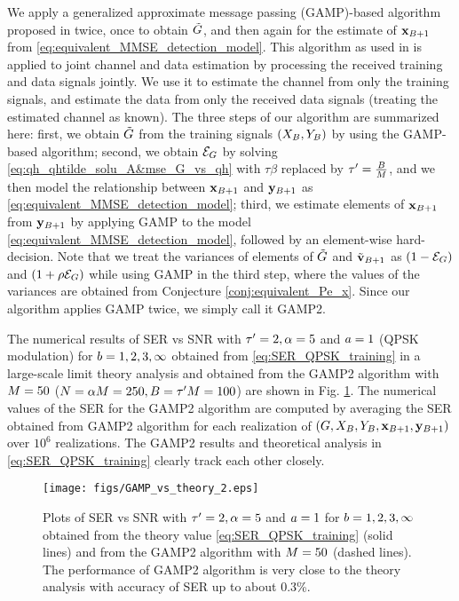 \documentclass[12pt, draftclsnofoot,journal,onecolumn]{IEEEtran}
\begin{document}
We apply a generalized approximate message passing (GAMP)-based algorithm proposed in \cite{wen2016bayes} twice, once to obtain $\tilde{G}$, and then again for the estimate of ${\mathbf{x}}_{B+1}$ from \eqref{eq:equivalent_MMSE_detection_model}. This algorithm as used in \cite{wen2016bayes} is applied to joint channel and data estimation by processing the received training and data signals jointly. We use it to estimate the channel from only the training signals, and estimate the data from only the received data signals (treating the estimated channel as known). The three steps of our algorithm are summarized here: first, we obtain $\tilde{G}$ from the training signals $(X_{B},Y_{B})$ by using the GAMP-based algorithm; second, we obtain ${\mathcal{E}}_{G}$ by solving \eqref{eq:qh_qhtilde_solu_A&mse_G_vs_qh} with $\tau\beta$ replaced by $\tau'=\frac{B}{M}$, and we then model the relationship between ${\mathbf{x}}_{B+1}$ and ${\mathbf{y}}_{B+1}$ as \eqref{eq:equivalent_MMSE_detection_model}; third, we estimate elements of ${\mathbf{x}}_{B+1}$ from ${\mathbf{y}}_{B+1}$ by applying GAMP to the model \eqref{eq:equivalent_MMSE_detection_model}, followed by an element-wise hard-decision. Note that we treat the variances of elements of $\tilde{G}$ and $\tilde{{\mathbf{v}}}_{B+1}$ as $(1-{\mathcal{E}}_{G})$ and $(1+\rho{\mathcal{E}}_{G})$ while using GAMP in the third step, where the values of the variances are obtained from Conjecture \ref{conj:equivalent_Pe_x}.  
Since our algorithm applies GAMP twice, we simply call it GAMP2.


The numerical results of SER vs SNR with 
 $\tau'=2,\alpha=5$ and $a=1$ (QPSK modulation) for $b=1,2,3,\infty$ obtained from \eqref{eq:SER_QPSK_training} in a large-scale limit theory analysis and obtained from the GAMP2 algorithm with $M=50$ ($N=\alpha M=250, B=\tau'M=100$) are shown in Fig. \ref{fig:GAMP_vs_theory}. The numerical values of the SER for the GAMP2 algorithm are computed by averaging the SER obtained from GAMP2 algorithm for each realization of $(G, X_{B}, Y_{B}, {\mathbf{x}}_{B+1}, {\mathbf{y}}_{B+1})$ over $10^6$ realizations.  The GAMP2 results and theoretical analysis in \eqref{eq:SER_QPSK_training} clearly track each other closely.

\begin{figure}
\texttt{[image: figs/GAMP\_vs\_theory\_2.eps]}
\centering
    \caption{Plots of SER vs SNR with $\tau'=2,\alpha=5$ and $a=1$ for $b=1,2,3,\infty$ obtained from the theory value \eqref{eq:SER_QPSK_training} (solid lines) and from the GAMP2 algorithm with $M=50$ (dashed lines). The performance of GAMP2 algorithm is very close to the theory analysis with accuracy of SER up to about 0.3\%.}
    \label{fig:GAMP_vs_theory}
\end{figure}
\end{document}

